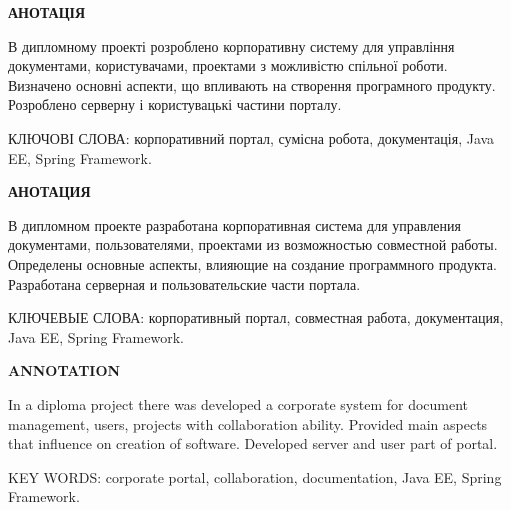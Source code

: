 \newpage
\begin{center}
\bf{АНОТАЦІЯ}
\end{center}

\par В дипломному проекті розроблено корпоративну систему для управління документами, користувачами, проектами з можливістю спільної роботи. Визначено основні аспекти, що впливають на створення програмного продукту. Розроблено серверну і користувацькі частини порталу.
\vspace{10 mm}
\par КЛЮЧОВІ СЛОВА: корпоративний портал, сумісна робота, документація, Java EE, Spring Framework.

\newpage
\begin{center}
\bf{АНОТАЦИЯ}
\end{center}

\par В дипломном проекте разработана корпоративная система для управления документами, пользователями, проектами из возможностью совместной работы. Определены основные аспекты, влияющие на создание программного продукта. Разработана серверная и пользовательские части портала.
\vspace{10 mm}
\par КЛЮЧЕВЫЕ СЛОВА: корпоративный портал, совместная работа, документация, Java EE, Spring Framework.


\newpage
\begin{center}
\bf{ANNOTATION}
\end{center}

\par In a diploma project there was developed a corporate system for document management, users, projects with collaboration ability. Provided main aspects that influence on creation of software. Developed server and user part of portal.
\vspace{10 mm}
\par KEY WORDS: corporate portal, collaboration, documentation, Java EE, Spring Framework.



